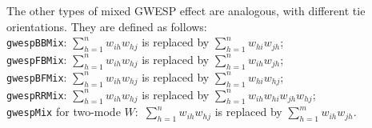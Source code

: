 \documentclass[a4paper,fleqn,11pt]{article}
\newcommand{\+}{\, + \,}
\newcounter{savenumi}
\begin{document}
\begin{enumerate}
The other types of mixed GWESP effect are analogous, with
different tie orientations. They are defined as follows:\\
\texttt{gwespBBMix}: ${\sum_{h=1}^n w_{ih}w_{hj} }$
is replaced by ${\sum_{h=1}^n w_{hi}w_{jh} }$;\\[0.3em]
\texttt{gwespFBMix}: ${\sum_{h=1}^n w_{ih}w_{hj} }$
is replaced by ${\sum_{h=1}^n w_{ih}w_{jh} }$;\\[0.3em]
\texttt{gwespBFMix}: ${\sum_{h=1}^n w_{ih}w_{hj} }$
is replaced by ${\sum_{h=1}^n w_{hi}w_{hj} }$;\\[0.3em]
\texttt{gwespRRMix}: ${\sum_{h=1}^n w_{ih}w_{hj} }$
is replaced by ${\sum_{h=1}^n w_{ih}w_{hi}w_{jh}w_{hj} }$;\\[0.3em]
\texttt{gwespMix} for two-mode $W$:\ ${\sum_{h=1}^n w_{ih}w_{hj} }$
is replaced by ${\sum_{h=1}^m w_{ih}w_{jh} }$.
\setcounter{savenumi}{\value{enumi}}
\end{enumerate}
\end{document}
